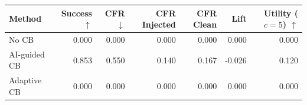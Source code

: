 \begin{tabular}{lrrrrrr}
\toprule
Method & Success $\uparrow$ & CFR $\downarrow$ & CFR Injected & CFR Clean & Lift & Utility ($c=5$) $\uparrow$ \\
\midrule
No CB & 0.000 & 0.000 & 0.000 & 0.000 & 0.000 & 0.000 \\
AI-guided CB & 0.853 & 0.550 & 0.140 & 0.167 & -0.026 & 0.120 \\
Adaptive CB & 0.000 & 0.000 & 0.000 & 0.000 & 0.000 & 0.000 \\
\bottomrule
\end{tabular}
